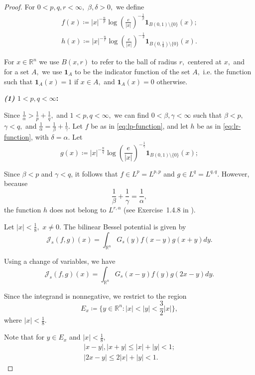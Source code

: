 \documentclass[12pt]{article}
\theoremstyle{definition}
\theoremstyle{remark}
\numberwithin{equation}{section}
\begin{document}
\begin{proof} 
For $0<p,q,r<\infty,$ $\beta,\delta>0,$ we define
   \begin{gather}
    f(x)\coloneq |x|^{-\frac{n}{p}}\log\left(\frac{e}{|x|}\right)^{-\frac{1}{\beta}}\mathbf{1}_{B(0,1)\setminus \{0\}}(x); \label{eq:lp-function}\\
    h(x)\coloneq |x|^{-\frac{n}{r}}\log\left(\frac{e}{|x|}\right)^{-\frac{1}{\delta}}\mathbf{1}_{B(0,\frac{1}{8})\setminus\{0\}}(x).\label{eq:lr-function}
    \end{gather}

For $x\in \mathbb{R}^n$ we use $B(x,r)$ to refer to the ball of radius $r,$ centered at $x,$ and for a set $A,$ we use $\mathbf{1}_{A}$ to be the indicator function of the set $A,$ i.e. the function such that $\mathbf{1}_{A}(x)=1$ if $x\in A,$ and $\mathbf{1}_{A}(x)=0$ otherwise. 

\noindent\textbf{\textit{(1)} $1<p,q<\infty$:}

    Since $\frac{1}{\alpha}>\frac{1}{p}+\frac{1}{q},$ and $1<p,q< \infty,$ we can find $0<\beta, \gamma< \infty$ such that $\beta <p,$ $\gamma <q,$ and $\frac{1}{\alpha}=\frac{1}{\beta}+\frac{1}{\gamma}.$  Let $f$ be as in \ref{eq:lp-function}, and let $h$ be as in \eqref{eq:lr-function}, with $\delta = \alpha.$
    Let \[
     g(x)\coloneq |x|^{-\frac{n}{q}}\log\left(\frac{e}{|x|}\right)^{-\frac{1}{\gamma}} \mathbf{1}_{B(0,1)\setminus\{0\}}(x); 
    \]

Since $\beta<p$ and $\gamma<q$, it follows that $f\in L^p = L^{p,p}$ and $g\in L^q = L^{q,q}$. However, because
\[
\frac{1}{\beta}+\frac{1}{\gamma}=\frac{1}{\alpha},
\]
the function $h$ does not belong to $L^{r,\alpha}$ (see Exercise~1.4.8 in \cite{Gra}).


Let $|x|<\frac{1}{8},$ $x\neq 0.$ The bilinear Bessel potential is given by 
\[
\mathcal{J}_s(f,g)(x)=\int_{\mathbb{R}^n}G_s(y)f(x-y)g(x+y)dy.
\]

Using a change of variables, we have 
\[
\mathcal{J}_s(f,g)(x)=\int_{\mathbb{R}^n}G_s(x-y)f(y)g(2x-y)dy.
\]

Since the integrand is nonnegative, we restrict to the region 
\begin{equation} \label{eq:set-e-x}
E_x\coloneq \{y\in \mathbb{R}^n: |x|<|y|<\frac{3}{2}|x|\},
\end{equation}
where $|x|<\frac{1}{8}.$

Note that for $y\in E_x$ and $|x|<\frac{1}{8},$
\begin{gather*}
|x-y|, |x+y|\leq |x|+|y|< 1;\\
|2x-y|\leq 2|x|+|y|< 1.
\end{gather*}


\end{proof}
\end{document}
